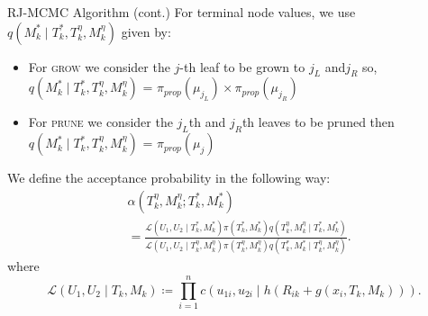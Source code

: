 \documentclass[11pt]{beamer}
\begin{document}
\begin{frame}[shrink=10]{RJ-MCMC Algorithm (cont.)}
    For terminal node values, we use $q\left(M_k^\ast\mid T_k^\ast, T_k^{\eta}, M_k^{\eta}\right)$ given by:
\begin{itemize}
	\item For \textsc{grow} we consider the $j$-th leaf to be grown to $j_L$ and$j_R$ so,
	$q\left(M_k^\ast\mid T_k^\ast, T_k^{\eta}, M_k^{\eta}\right)$ = $\pi_{prop}(\mu_{j_L})\times\pi_{prop}(\mu_{j_R})$
	\item For \textsc{prune} we consider the $j_L$th and $j_R$th leaves to be pruned then $q\left(M_k^\ast\mid T_k^\ast, T_k^{\eta}, M_k^{\eta}\right)$ = $\pi_{prop}(\mu_j)$
\end{itemize}

We define the acceptance probability in the following way:
\begin{align*}
    &\alpha\left(T_k^{\eta},M_k^{\eta};T_k^\ast, M_k^\ast\right)\\
	&= \frac{\mathcal{L}(U_1,U_2\mid T_k^\ast,M_k^\ast)\pi(T_k^\ast,M_k^\ast)q\left(T_k^{\eta},M_k^{\eta}\mid T_k^\ast, M_k^\ast\right)}
	{\mathcal{L}(U_1,U_2\mid T_k^{\eta},M_k^{\eta})\pi(T_k^{\eta},M_k^{\eta}) q\left(T_k^\ast, M_k^\ast \mid T_k^{\eta},M_k^{\eta}\right)}.
\end{align*}
where 
\begin{equation*}
	\mathcal{L}(U_1,U_2\mid T_k, M_{k})\coloneqq \prod_{i=1}^{n}c\left(u_{1i},u_{2i}\mid h\left(R_{ik}+g(x_i, T_k, M_k)\right)\right).
\end{equation*}

\end{frame}
\end{document}
